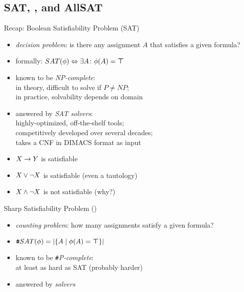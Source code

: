 \subsection{SAT, \ssat{}, and AllSAT}

\begin{frame}{\myframetitle}
	\begin{fancycolumns}
		\begin{definition}{Recap: Boolean Satisfiability Problem (SAT)}
			\begin{itemize}
				\item \emph{decision problem}: is there any assignment $A$ that satisfies a given formula?
				\item formally: $SAT(\phi) \mequals \exists A \colon \phi(A) = \top$
				\item known to be \emph{NP-complete}:\\
					in theory, difficult to solve if $P \neq NP$;\\
					in practice, solvability depends on domain
				\item answered by \emph{SAT solvers}:\\
					highly-optimized, off-the-shelf tools;\\
					competitively developed over several decades;\\
					takes a CNF in DIMACS format as input
			\end{itemize}
		\end{definition}
		\begin{example}{}
			\begin{itemize}
				\item $X \rightarrow Y$ is satisfiable
				\item $X \vee \neg X$ is satisfiable (even a tautology)
				\item $X \wedge \neg X$ is not satisfiable (why?)
			\end{itemize}
		\end{example}
	\nextcolumn
		\begin{definition}{Sharp Satisfiability Problem (\ssat{})}
			\begin{itemize}
				\item \emph{counting problem}: how many assignments satisfy a given formula?
				\item $\ssat(\phi) = \abs{\{A \mid \phi(A) = \top\}}$
				\item known to be \emph{\texttt{\#}P-complete}:\\
					at least as hard as SAT (probably harder)
				\item answered by \emph{\ssat{} solvers}

\end{itemize}
\end{definition}
\end{fancycolumns}
\end{frame}
